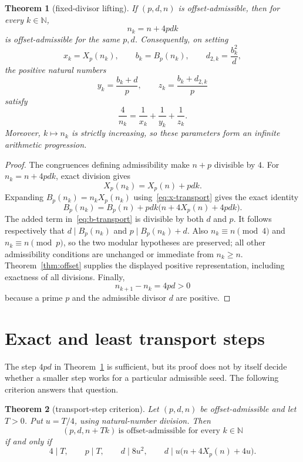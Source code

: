 \documentclass[11pt]{article}
\newtheorem{theorem}{Theorem}[section]
\theoremstyle{remark}
\newcommand{\N}{\mathbb{N}}
\begin{document}
\begin{theorem}[fixed-divisor lifting]\label{thm:lifting}
If \((p,d,n)\) is offset-admissible, then for every \(k\in\N\),
\[
  n_k=n+4pdk
\]
is offset-admissible for the same \(p,d\).  Consequently, on setting
\[
  x_k=X_p(n_k),\qquad b_k=B_p(n_k),\qquad
  d_{2,k}=\frac{b_k^2}{d},
\]
the positive natural numbers
\[
  y_k=\frac{b_k+d}{p},
  \qquad
  z_k=\frac{b_k+d_{2,k}}{p}
\]
satisfy
\[
  \frac4{n_k}=\frac1{x_k}+\frac1{y_k}+\frac1{z_k}.
\]
Moreover, \(k\mapsto n_k\) is strictly increasing, so these parameters form an
infinite arithmetic progression.
\end{theorem}

\begin{proof}
The congruences defining admissibility make \(n+p\) divisible by \(4\).
For \(n_k=n+4pdk\), exact division gives
\begin{equation}\label{eq:x-transport}
  X_p(n_k)=X_p(n)+pdk.
\end{equation}
Expanding \(B_p(n_k)=n_k X_p(n_k)\) using~\eqref{eq:x-transport} gives the exact
identity
\begin{equation}\label{eq:b-transport}
  B_p(n_k)
  =
  B_p(n)+pdk\bigl(n+4X_p(n)+4pdk\bigr).
\end{equation}
The added term in~\eqref{eq:b-transport} is divisible by both \(d\) and \(p\).
It follows respectively that \(d\mid B_p(n_k)\) and
\(p\mid B_p(n_k)+d\).  Also \(n_k\equiv n\pmod4\) and
\(n_k\equiv n\pmod p\), so the two modular hypotheses are preserved; all other
admissibility conditions are unchanged or immediate from \(n_k\ge n\).
Theorem~\ref{thm:offset} supplies the displayed positive representation,
including exactness of all divisions.  Finally,
\[
  n_{k+1}-n_k=4pd>0
\]
because a prime \(p\) and the admissible divisor \(d\) are positive.
\end{proof}

\section{Exact and least transport steps}

The step \(4pd\) in Theorem~\ref{thm:lifting} is sufficient, but its proof does
not by itself decide whether a smaller step works for a particular admissible
seed.  The following criterion answers that question.

\begin{theorem}[transport-step criterion]\label{thm:period-test}
Let \((p,d,n)\) be offset-admissible and let \(T>0\).  Put \(u=T/4\), using
natural-number division.  Then
\[
  (p,d,n+Tk)\ \text{is offset-admissible for every }k\in\N
\]
if and only if
\begin{equation}\label{eq:period-test}
  4\mid T,\qquad p\mid T,\qquad
  d\mid 8u^2,\qquad
  d\mid u\bigl(n+4X_p(n)+4u\bigr).
\end{equation}
\end{theorem}
\end{document}
